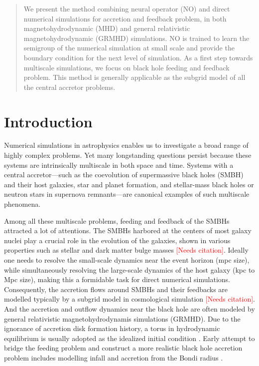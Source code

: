 \documentclass{article}
\newcommand{\red}{\textcolor{red}}
\newcommand{\AddCite}{\red{[Needs citation]}}
\newcommand{\hyw}[1]{{\color{red}{[{#1}]}}}
\newcommand{\hywcom}[1]{{\color{purple}{[HYW: #1]}}}
\begin{document}
\begin{CJK*}{UTF8}{gbsn}
\begin{abstract}
We present the method combining neural operator (NO) and direct \hyw{multi-level} numerical simulations for accretion and feedback problem, in both magnetohydrodynamic (MHD) and general relativistic magnetohydrodynamic (GRMHD) simulations. 
NO is trained to learn the semigroup of the numerical simulation at small scale and provide the boundary condition for the next level of simulation.
As a first step towards multiscale simulations, we focus on black hole feeding and feedback problem.
\hyw{Findings:}
This method is generally applicable as the subgrid model of all the central accretor problems.
\end{abstract}



\end{CJK*}

\section{Introduction}

\hywcom{Multiscale problems.}
Numerical simulations in astrophysics enables us to investigate a broad range of highly complex problems.
Yet many longstanding questions persist because these systems are intrinsically multiscale in both space and time.
Systems with a central accretor—such as the coevolution of supermassive black holes (SMBH) and their host galaxies, star and planet formation, and stellar-mass black holes or neutron stars in supernova remnants—are canonical examples of such multiscale phenomena.

Among all these multiscale problems, feeding and feedback of the SMBHs attracted a lot of attentions.
The SMBHs harbored at the centers of most galaxy nuclei play a crucial role in the evolution of the galaxies, shown in various properties such as stellar and dark matter bulge masses \AddCite.
Ideally one needs to resolve the small-scale dynamics near the event horizon (mpc size), while simultaneously
resolving the large-scale dynamics of the host galaxy (kpc to Mpc size),
making this a formidable task for direct numerical simulations.
Consequently, the accretion flows around SMBHs and their feedbacks are modelled typically by a subgrid model in cosmological simulation \AddCite. 
And the accretion and outflow dynamics near the black hole are often modeled by general relativistic magnetohydrodynamis simulations (GRMHD).
Due to the ignorance of accretion disk formation history, a torus in hydrodynamic equilibrium is usually adopted as the idealized initial condition \cite{1976ApJ...207..962F}.
Early attempt to bridge the feeding problem and construct a more realistic black hole accretion problem includes modelling infall and accretion from the Bondi radius \cite{Bondi:1952MNRAS.112..195B}.
\end{document}
